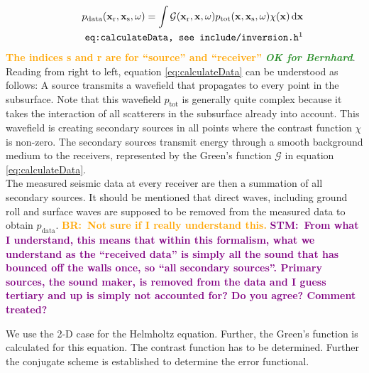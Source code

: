 \documentclass[10pt,a4paper]{article}
\newcommand{\df}[1]{\, \ensuremath{\mbox{d}#1}}
\newcommand{\commentstmtwo}[1]{\textcolor{purple}{\textbf{STM:\ #1}}}
\newcommand{\newstmtwo}[1]{\textcolor{orange}{\textbf{#1}}}
\newcommand{\brok}{\textcolor{ForestGreen}{\textit{\textbf{OK for Bernhard}}}}
\newcommand{\commentbr}[1]{\textcolor{orange}{\textbf{BR:\ #1}}}
\newcommand{\xs}{\mathbf{x}_\text{s}}
\newcommand{\xr}{\mathbf{x}_\text{r}}
\newcommand{\x}{\mathbf{x}}
\begin{document}
\begin{align}
\label{eq:calculateData}
p_\text{data}(\mathbf{x_\text{r}},\mathbf{x_\text{s}},\omega) = \int
\mathcal{G}(\xr, \x, \omega) p_\text{tot}(\x, \xs, \omega) \chi(\x)
\df{\x}\\
\tag*{\texttt{eq:calculateData, see include/inversion.h\footnotemark}}
\end{align}
\newstmtwo{The indices \textbf{s} and \textbf{r} are for ``source''
and ``receiver''} \brok.
Reading from right to left, equation \ref{eq:calculateData} can be understood as
follows: A source transmits a wavefield that propagates to every point
in the subsurface. Note that this wavefield $p_\text{tot}$ is
generally quite complex because it takes the interaction of all
scatterers in the subsurface already into account. This wavefield is
creating secondary sources in all points where the contrast function
$\chi$ is non-zero. The secondary sources transmit energy through a
smooth background medium to the receivers, represented by the Green's
function $\mathcal{G}$ in equation \ref{eq:calculateData}.\\ %
The measured seismic data at every receiver are then a summation of
all secondary sources. It should be mentioned that direct waves,
including ground roll and surface waves are supposed to be removed
from the measured data to obtain $p_\text{data}$.
\commentbr{Not sure if I really understand this.}
\commentstmtwo{From what I understand, this means that within this formalism,
what we understand as the ``received data'' is simply all the sound that has bounced off the walls once,
so ``all secondary sources''. Primary sources, the sound maker, is removed from the data
and I guess tertiary and up is simply not accounted for?
Do you agree? Comment treated?}
\newline

We use the 2-D case for the Helmholtz equation. Further, the Green's
function is calculated for this equation. The contrast function has to
be determined. Further the conjugate scheme is established to
determine the error functional.
\newline
\end{document}
